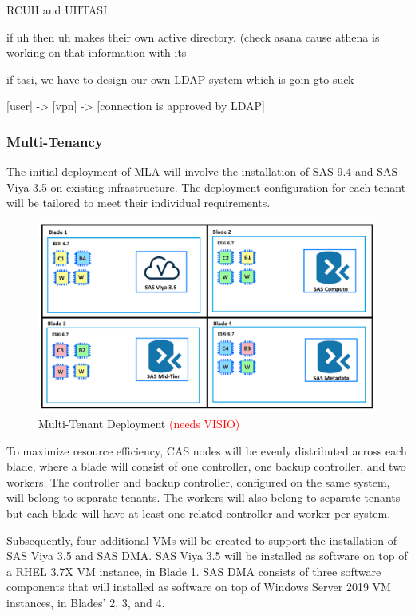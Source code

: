 RCUH and UHTASI.

if uh then uh makes their own active directory. (check asana cause athena is working on that information with its

if tasi, we have to design our own LDAP system which is goin gto suck 

[user] -> [vpn] -> [connection is approved by LDAP]

\subsubsection{Multi-Tenancy}

The initial deployment of MLA will involve the installation of SAS 9.4 and SAS Viya 3.5 on existing infrastructure. The deployment configuration for each tenant will be tailored to meet their individual requirements. 

\begin{figure}[H]
    \centering
    \includegraphics[scale = 0.52]{images/initial-deployment-diagram.png}
    \caption{Multi-Tenant Deployment \textcolor{red}{(needs VISIO)} }
    \label{Initial Multi-Tenant Deployment}
\end{figure} 

To maximize resource efficiency, CAS nodes will be evenly distributed across each blade, where a blade will consist of one controller, one backup controller, and two workers. The controller and backup controller, configured on the same system, will belong to separate tenants. The workers will also belong to separate tenants but each blade will have at least one related controller and worker per system. 

Subsequently, four additional VMs will be created to support the installation of SAS Viya 3.5 and SAS DMA. SAS Viya 3.5 will be installed as software on top of a RHEL 3.7X VM instance, in Blade 1. SAS DMA consists of three software components that will installed as software on top of Windows Server 2019 VM instances, in Blades' 2, 3, and 4. 

